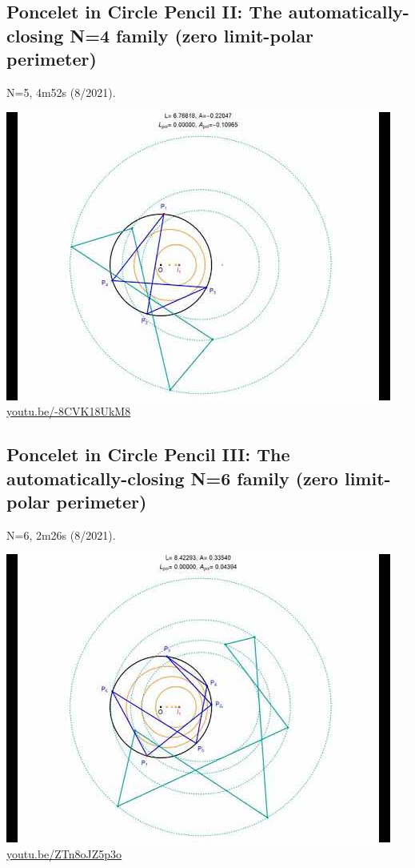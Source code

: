 \documentclass[12pt]{amsart}
\begin{document}
\subsection{Poncelet in Circle Pencil II: The automatically-closing N=4 family (zero limit-polar perimeter)}
\label{vid:-8CVK18UkM8}
\noindent N=5, 4m52s (8/2021). 
\begin{center}\includegraphics[width=.5\textwidth]{pics/-8CVK18UkM8.jpg} \\ 
\href{https://youtu.be/-8CVK18UkM8}{\url{youtu.be/-8CVK18UkM8}}\end{center}
% 
\subsection{Poncelet in Circle Pencil III: The automatically-closing N=6 family (zero limit-polar perimeter)}
\label{vid:ZTn8oJZ5p3o}
\noindent N=6, 2m26s (8/2021). 
\begin{center}\includegraphics[width=.5\textwidth]{pics/ZTn8oJZ5p3o.jpg} \\ 
\href{https://youtu.be/ZTn8oJZ5p3o}{\url{youtu.be/ZTn8oJZ5p3o}}\end{center}
% 
\end{document}
